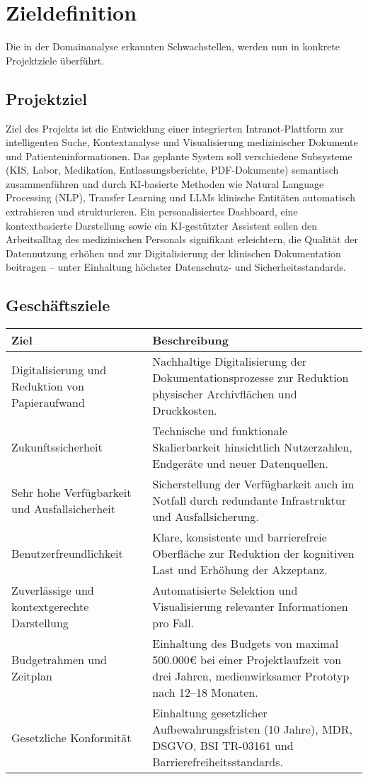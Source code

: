 {\let\clearpage\relax
\chapter{Zieldefinition}}
\label{sec:zieldefinition}
Die in der Domainanalyse erkannten Schwachstellen, werden nun in konkrete Projektziele überführt.
\section{Projektziel}

Ziel des Projekts ist die Entwicklung einer integrierten Intranet-Plattform zur intelligenten Suche, Kontextanalyse und Visualisierung medizinischer Dokumente und Patienteninformationen. Das geplante System soll verschiedene Subsysteme (KIS, Labor, Medikation, Entlassungsberichte, PDF-Dokumente) semantisch zusammenführen und durch KI-basierte Methoden wie Natural Language Processing (NLP), Transfer Learning und LLMs klinische Entitäten automatisch extrahieren und strukturieren.
Ein personalisiertes Dashboard, eine kontextbasierte Darstellung sowie ein KI-gestützter Assistent sollen den Arbeitsalltag des medizinischen Personals signifikant erleichtern, die Qualität der Datennutzung erhöhen und zur Digitalisierung der klinischen Dokumentation beitragen – unter Einhaltung höchster Datenschutz- und Sicherheitsstandards.
\section{Geschäftsziele}

\begin{center}
\begin{tabular}{|p{5cm}|p{10cm}|}
	\hline
	\textbf{Ziel} & \textbf{Beschreibung} \\
	\hline
	Digitalisierung und Reduktion von Papieraufwand & Nachhaltige Digitalisierung der Dokumentationsprozesse zur Reduktion physischer Archivflächen und Druckkosten. \\
	\hline
	Zukunftssicherheit & Technische und funktionale Skalierbarkeit hinsichtlich Nutzerzahlen, Endgeräte und neuer Datenquellen. \\
	\hline
	Sehr hohe Verfügbarkeit und Ausfallsicherheit & Sicherstellung der Verfügbarkeit auch im Notfall durch redundante Infrastruktur und Ausfallsicherung. \\
	\hline
	Benutzerfreundlichkeit & Klare, konsistente und barrierefreie Oberfläche zur Reduktion der kognitiven Last und Erhöhung der Akzeptanz. \\
	\hline
	Zuverlässige und kontextgerechte Darstellung & Automatisierte Selektion und Visualisierung relevanter Informationen pro Fall. \\
	\hline
	Budgetrahmen und Zeitplan & Einhaltung des Budgets von maximal 500.000€ bei einer Projektlaufzeit von drei Jahren, medienwirksamer Prototyp nach 12–18 Monaten. \\
	\hline
	Gesetzliche Konformität & Einhaltung gesetzlicher Aufbewahrungsfristen (10 Jahre), MDR, DSGVO, BSI TR-03161 und Barrierefreiheitsstandards. \\
	\hline
\end{tabular}
\end{center}



